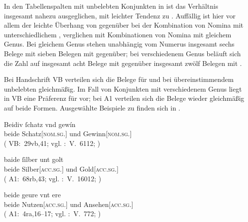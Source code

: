 In den Tabellenspalten mit unbelebten Konjunkten in
 ist das Verhältnis insgesamt nahezu ausgeglichen,
mit leichter Tendenz zu . Auffällig ist hier vor allem der leichte
Überhang von  gegenüber  bei der Kombination von
Nomina mit unterschiedlichem , verglichen mit Kombinationen von
Nomina mit gleichem Genus. Bei gleichem Genus stehen unabhängig vom Numerus
insgesamt sechs Belege mit  sieben Belegen mit
 gegenüber; bei verschiedenem Genus beläuft sich die Zahl auf
insgesamt acht Belege mit  gegenüber insgesamt zwölf Belegen mit
.

Bei Handschrift VB verteilen sich die Belege für  und
 bei übereinstimmendem unbelebten 
gleichmäßig. Im Fall von Konjunkten mit verschiedenem Genus liegt in VB
eine Präferenz für  vor; bei A1 verteilen sich die Belege wieder
gleichmäßig auf beide Formen. Ausgewählte Beispiele zu 
finden sich in .

\begin{exe}
\ex \label{ex:konjbeidirreginan}
	\begin{xlist}
	\ex \gll Beidiv ſchatz vnd gewín \\
			beide Schatz[\textsc{nom.sg.\MascI}] und Gewinn[\textsc{nom.sg.\MascI}] \\
		\trans {}
			(%
				VB:~29vb,41; vgl.
				\KC:~V.~6112;
				\cite[194]{schroeder1895}%
			)
		\label{ex:konjbeidirreginan_1}

	\ex \gll baide ſilber unt golt \\
			beide Silber[\textsc{acc.sg.\NeutI}] und Gold[\textsc{acc.sg.\NeutI}] \\
		\trans {}
			(%
				A1:~68rb,43; vgl.
				\KC:~V.~16012;
				\cite[370]{schroeder1895}%
			)
		\label{ex:konjbeidirreginan_2}

	\ex \gll beide geure vnt ere \\
			beide Nutzen[\textsc{acc.sg.\NeutI}] und Ansehen[\textsc{acc.sg.\FemI}] \\
		\trans {}
			(%
				A1:~4ra,16--17; vgl.
				\KC:~V.~772;
				\cite[95]{schroeder1895}%
			)
		\label{ex:konjbeidirreginan_3}
	\end{xlist}
\end{exe}


